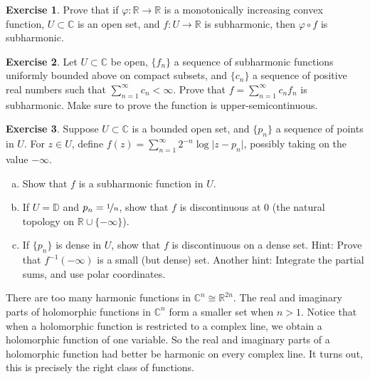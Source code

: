 \documentclass[12pt,openany]{book}
\newcommand{\sabs}[1]{\lvert {#1} \rvert}
\newcommand{\C}{{\mathbb{C}}}
\newcommand{\R}{{\mathbb{R}}}
\newcommand{\D}{{\mathbb{D}}}
\theoremstyle{plain}
\theoremstyle{remark}
\theoremstyle{definition}
\newenvironment{exbox}{%
    \def\FrameCommand{\vrule width 1pt \relax\hspace{10pt}}%
    \MakeFramed{\advance\hsize-\width\FrameRestore}%
}{%
    \endMakeFramed
}
\newenvironment{exparts}{%
    \leavevmode\begin{enumerate}[a),noitemsep,topsep=0pt,parsep=0pt,partopsep=0pt]
}{%
    \end{enumerate}
}
\theoremstyle{exercise}
\newtheorem{exercise}{Exercise}[section]
\theoremstyle{example}
\begin{document}
\begin{exbox}
\begin{exercise}
Prove that if $\varphi \colon \R \to \R$ is a monotonically increasing
convex function, $U \subset \C$ is an open set, and $f \colon U \to \R$
is subharmonic, then $\varphi \circ f$ is subharmonic.
\end{exercise}

\begin{exercise}
Let $U \subset \C$ be open, $\{ f_n \}$ a sequence of
subharmonic functions uniformly bounded above on compact subsets, and
$\{ c_n \}$ a sequence of positive real numbers such that
$\sum_{n=1}^\infty c_n < \infty$.
Prove that $f = \sum_{n=1}^\infty c_n f_n$ is subharmonic.  Make sure to prove
the function is upper-semicontinuous.
\end{exercise}

\begin{exercise}
\pagebreak[2]%
Suppose $U \subset \C$ is a bounded open set, and $\{ p_n \}$ a sequence of points in
$U$. For $z \in U$, define
$f(z) = \sum_{n=1}^\infty 2^{-n} \log \sabs{z-p_n}$, possibly taking on the
value $-\infty$.
\begin{exparts}
\item
Show that $f$ is a subharmonic function in $U$.
\item
If $U = \D$ and $p_n = \nicefrac{1}{n}$, show that $f$ is discontinuous at 0
(the natural topology on $\R \cup \{ -\infty \}$).
\item
If $\{ p_n \}$ is dense in $U$, show that $f$
is discontinuous on a dense set.
Hint: Prove that $f^{-1}(-\infty)$ is a small (but dense) set.
Another hint: Integrate the partial sums, and use polar coordinates.
\end{exparts}
\end{exercise}
\end{exbox}

\pagebreak[2]
There are too many harmonic functions in $\C^n \cong \R^{2n}$.
The real and imaginary parts of holomorphic functions in $\C^n$
form a smaller set when $n > 1$.  Notice that when a holomorphic
function is restricted to a complex line, we obtain a holomorphic
function of one variable.  So the real and imaginary parts
of a holomorphic function had better be harmonic on every complex line.
It turns out, this is precisely the right class of functions.
\end{document}
